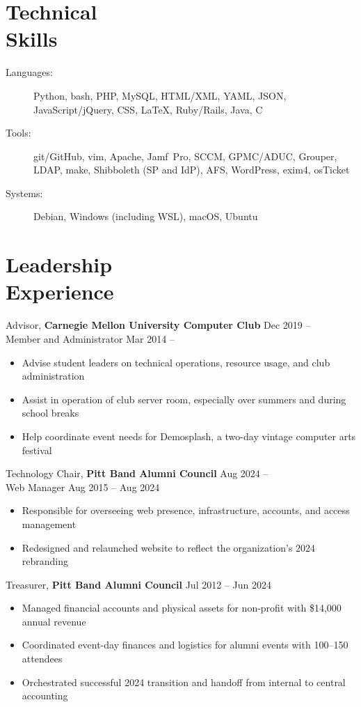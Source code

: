 \documentclass[11pt]{article}
\newcommand{\textdb}[1]{\fontseries{db}\selectfont#1\normalfont}
\newcommand{\present}{\phantom{Xxx 20XX}}
\newcommand{\itemizeonly}{\leavevmode\par\vspace{\dimexpr-\baselineskip-\parskip}}
\begin{document}
\section{Technical\\ Skills}

\itemizeonly
\begin{description}
	\item[\textdb{Languages:}] Python, bash, PHP, MySQL, HTML/XML, YAML, JSON,
		JavaScript/jQuery, CSS, \LaTeX, Ruby/Rails, Java, C
	\item[\textdb{Tools:}] git/GitHub, vim, Apache,
		Jamf~Pro, SCCM, GPMC/ADUC, Grouper, LDAP, make,
		Shibboleth (SP and IdP), AFS, WordPress, exim4, osTicket
	\item[\textdb{Systems:}] Debian, Windows (including WSL), macOS, Ubuntu
\end{description}



\section{Leadership\\ Experience}

\textdb{
Advisor,
\textbf{Carnegie Mellon University Computer Club}
	\hfill Dec 2019 -- \present \\
}
\textdb{
Member and Administrator
	\hfill Mar 2014 -- \present
}
\begin{itemize}
	\item Advise student leaders on technical operations,
		resource usage, and club administration
	\item Assist in operation of club server room,
		especially over summers and during school breaks
	\item Help coordinate event needs for Demosplash,
		a two-day vintage computer arts festival
\end{itemize}

\textdb{
Technology Chair,
\textbf{Pitt Band Alumni Council}
	\hfill Aug 2024 -- \present \\
}
\textdb{
Web Manager
	\hfill Aug 2015 -- Aug 2024
}
\begin{itemize}
	\item Responsible for overseeing web presence, infrastructure,
		accounts, and access management
	\item Redesigned and relaunched website
		to reflect the organization's 2024 rebranding
\end{itemize}
\textdb{
Treasurer,
\textbf{Pitt Band Alumni Council}
	\hfill Jul 2012 -- Jun 2024
}
\begin{itemize}
	\item Managed financial accounts and physical assets
		for non-profit with \$14,000 annual revenue
	\item Coordinated event-day finances and logistics for alumni events with 100--150 attendees
	\item Orchestrated successful 2024 transition and handoff
		from internal to central accounting
\end{itemize}
\end{document}
